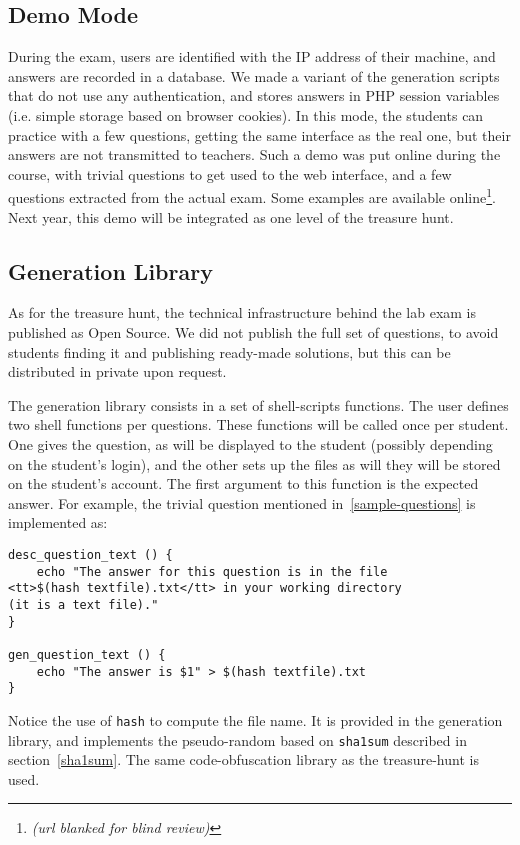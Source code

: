 \documentclass{sig-alternate}
\newcommand{\demosurl}[0]{\textit{(url blanked for blind review)}}
\newcommand{\demosurl}[0]{\url{http://www-verimag.imag.fr/~moy/demos-unix-training/}}
\begin{document}
\subsection{Demo Mode}

During the exam, users are identified with the IP address of their
machine, and answers are recorded in a database. We made a variant of
the generation scripts that do not use any authentication, and stores
answers in PHP session variables (i.e. simple storage based on browser
cookies). In this mode, the students can practice with a few
questions, getting the same interface as the real one, but their
answers are not transmitted to teachers. Such a demo was put online
during the course, with trivial questions to get used to the web
interface, and a few questions extracted from the actual exam. Some
examples are available online\footnote{\demosurl}.
Next year, this demo will be integrated as one level of the treasure
hunt.

\subsection{Generation Library}

As for the treasure hunt, the technical infrastructure behind the
lab exam is published as Open Source. We did not publish the full
set of questions, to avoid students finding it and publishing
ready-made solutions, but this can be distributed in private upon
request.

The generation library consists in a set of shell-scripts functions.
The user defines two shell functions per questions. These functions
will be called once per student. One gives the question, as will be
displayed to the student (possibly depending on the student's login),
and the other sets up the files as will they will be stored on the
student's account. The first argument to this function is the expected
answer. For example, the trivial question mentioned
in~\ref{sample-questions} is implemented as:

{\small
\begin{verbatim}
desc_question_text () {
    echo "The answer for this question is in the file
<tt>$(hash textfile).txt</tt> in your working directory
(it is a text file)."
}

gen_question_text () {
    echo "The answer is $1" > $(hash textfile).txt
}
\end{verbatim}
}
Notice the use of \texttt{hash} to compute the file name. It is
provided in the generation library, and implements the pseudo-random
based on \texttt{sha1sum} described in section~\ref{sha1sum}.
The same code-obfuscation library as the treasure-hunt is used.
\end{document}
